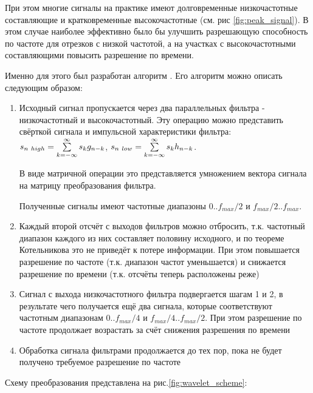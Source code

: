 
При этом многие сигналы на практике имеют долговременные низкочастотные составляющие и кратковременные высокочастотные (см. рис \ref{fig:peak_signal}\cite{wavelet_tutorial}). В этом случае наиболее эффективно было бы улучшить разрешающую способность по частоте для отрезков с низкой частотой, а на участках с высокочастотными составляющими повысить разрешение по времени. 

Именно для этого был разработан алгоритм . Его алгоритм можно описать следующим образом:

\begin{enumerate}
\item Исходный сигнал пропускается через два параллельных фильтра - низкочастотный и высокочастотный. Эту операцию можно представить свёрткой сигнала и импульсной характеристики фильтра: $s_{n~high}=\sum\limits_{k=-\infty}^{\infty}s_kg_{n-k}$, $s_{n~low}=\sum\limits_{k=-\infty}^{\infty}s_kh_{n-k}$. 

В виде матричной операции это представляется умножением вектора сигнала на матрицу преобразования фильтра. 

Полученные сигналы имеют частотные диапазоны $0..f_{max}/2$ и $f_{max}/2..f_{max}$.
\item Каждый второй отсчёт с выходов фильтров можно отбросить, т.к. частотный диапазон каждого из них составляет половину исходного, и по теореме Котельникова это не приведёт к потере информации. При этом повышается разрешение по частоте (т.к. диапазон частот уменьшается) и снижается разрешение по времени (т.к. отсчёты теперь расположены реже)
\item Сигнал с выхода низкочастотного фильтра подвергается шагам 1 и 2, в результате чего получается ещё два сигнала, которые соответствуют частотным диапазонам $0..f_{max}/4$ и $f_{max}/4..f_{max}/2$. При этом разрешение по частоте продолжает возрастать за счёт снижения разрешения по времени
\item Обработка сигнала фильтрами продолжается до тех пор, пока не будет получено требуемое разрешение по частоте
\end{enumerate}



Схему преобразования представлена на рис.\ref{fig:wavelet_scheme}\cite{wavelet_structure}:




